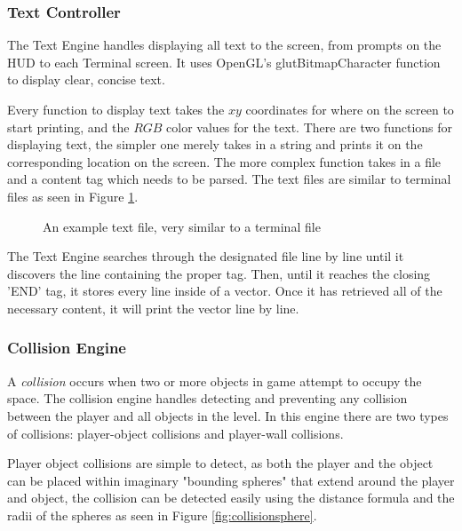 \documentclass{article}
\begin{document}
\subsubsection{Text Controller} \label{subsubsec:textcontroller}

The Text Engine handles displaying all text to the screen, from prompts on the HUD to each Terminal screen. It uses OpenGL's glutBitmapCharacter function to display clear, concise text.

Every function to display text takes the $xy$ coordinates for where on the screen to start printing, and the $RGB$ color values for the text. There are two functions for displaying text, the simpler one merely takes in a string and prints it on the corresponding location on the screen. The more complex function takes in a file and a content tag which needs to be parsed. The text files are similar to terminal files as seen in Figure \ref{fig:text}.

\begin{figure}[H]
\centering

\caption{An example text file, very similar to a terminal file}
\label{fig:text}
\end{figure}

The Text Engine searches through the designated file line by line until it discovers the line containing the proper tag. Then, until it reaches the closing 'END' tag, it stores every line inside of a vector. Once it has retrieved all of the necessary content, it will print the vector line by line.

\subsubsection{Collision Engine} \label{subsubsec:collision}

A \emph{collision} occurs when two or more objects in game attempt to occupy the space. The collision engine handles detecting and preventing any collision between the player and all objects in the level. In this engine there are two types of collisions: player-object collisions and player-wall collisions.

Player object collisions are simple to detect, as both the player and the object can be placed within imaginary "bounding spheres" that extend around the player and object, the collision can be detected easily using the distance formula and the radii of the spheres as seen in Figure \ref{fig:collisionsphere}.
\end{document}
